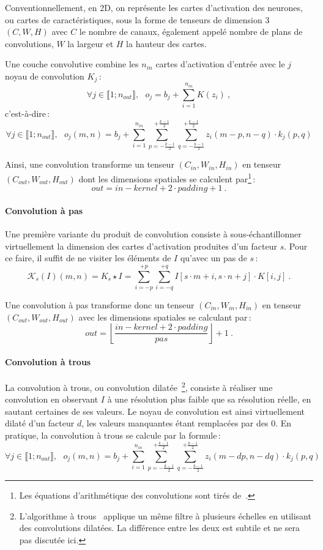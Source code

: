 Conventionnellement, en 2D, on représente les cartes d'activation des neurones, ou cartes de caractéristiques, sous la forme de tenseurs de dimension 3 $(C, W, H)$ avec $C$ le nombre de canaux, également appelé nombre de plans de convolutions, $W$ la largeur et $H$ la hauteur des cartes.

Une couche convolutive combine les $n_{in}$ cartes d'activation d'entrée avec le $j$\ieme{} noyau de convolution $K_j$\,:
$$\forall j \in \llbracket 1;n_{out} \rrbracket,~~~o_j = b_j + \sum_{i=1}^{n_{in}} K(z_i)~,$$ c'est-à-dire\,:
$$\forall j \in \llbracket 1;n_{out} \rrbracket,~~~o_j(m, n) = b_j + \sum_{i=1}^{n_{in}} \sum_{p=-\frac{k-1}{2}}^{+\frac{k-1}{2}} \sum_{q=-\frac{k-1}{2}}^{+\frac{k-1}{2}} z_i(m - p, n - q) \cdot k_j(p, q)$$

Ainsi, une convolution transforme un tenseur $(C_{in}, W_{in}, H_{in})$ en tenseur $(C_{out}, W_{out}, H_{out})$ dont les dimensions spatiales se calculent par\footnote{Les équations d'arithmétique des convolutions sont tirés de~\citet{dumoulin_guide_2016}.}\,:
$$\mathit{out} = \mathit{in} - \mathit{kernel} + 2\cdot \mathit{padding} + 1~.$$

\paragraph{Convolution à pas}

Une première variante du produit de convolution consiste à sous-échantillonner virtuellement la dimension des cartes d'activation produites d'un facteur $s$. Pour ce faire, il suffit de ne visiter les éléments de $I$ qu'avec un pas de $s$\,:
$$\mathcal{K}_s(I)(m,n) = K_s \star I = \sum_{i=-p}^{+p} \sum_{i=-q}^{+q} I[s \cdot m + i, s \cdot n + j] \cdot K[i, j]~.$$

Une convolution à pas transforme donc un tenseur $(C_{in}, W_{in}, H_{in})$ en tenseur $(C_{out}, W_{out}, H_{out})$ avec les dimensions spatiales se calculant par\,:
$$\mathit{out} = \left\lfloor \frac{\mathit{in} - \mathit{kernel} + 2 \cdot \mathit{padding}}{\mathit{pas}}\right\rfloor + 1~.$$

\paragraph{Convolution à trous}

La convolution à trous, ou convolution dilatée~\cite{yu_multi-scale_2015}\footnote{L'algorithme à trous~\cite{shensa_discrete_1992} applique un même filtre à plusieurs échelles en utilisant des convolutions dilatées. La différence entre les deux est subtile et ne sera pas discutée ici.}, consiste à réaliser une convolution en observant $I$ à une résolution plus faible que sa résolution réelle, en sautant certaines de ses valeurs. Le noyau de convolution est ainsi virtuellement dilaté d'un facteur $d$, les valeurs manquantes étant remplacées par des 0. En pratique, la convolution à trous se calcule par la formule\,:
$$\forall j \in \llbracket 1;n_{out} \rrbracket,~~~o_j(m, n) = b_j + \sum_{i=1}^{n_{in}} \sum_{p=-\frac{k-1}{2}}^{+\frac{k-1}{2}} \sum_{q=-\frac{k-1}{2}}^{+\frac{k-1}{2}} z_i(m - dp, n - dq) \cdot k_j(p, q)$$

